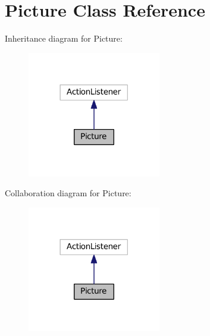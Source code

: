 \hypertarget{class_picture}{}\section{Picture Class Reference}
\label{class_picture}


Inheritance diagram for Picture\+:
\nopagebreak
\begin{figure}[H]
\begin{center}
\leavevmode
\includegraphics[width=165pt]{class_picture__inherit__graph}
\end{center}
\end{figure}


Collaboration diagram for Picture\+:
\nopagebreak
\begin{figure}[H]
\begin{center}
\leavevmode
\includegraphics[width=165pt]{class_picture__coll__graph}
\end{center}
\end{figure}
